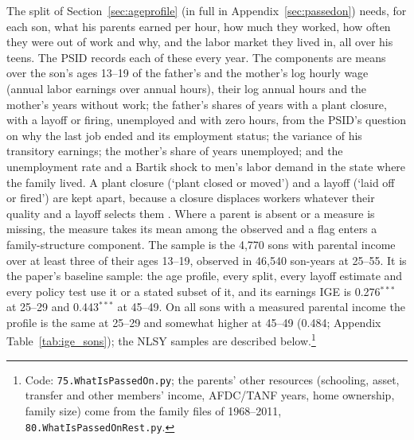 The split of Section~\ref{sec:ageprofile} (in full in Appendix~\ref{sec:passedon}) needs, for each son, what his parents earned per hour, how much they worked,
how often they were out of work and why, and the labor market they lived in, all over his teens. The PSID records each
of these every year. The components are means over the son's ages 13--19 of the father's and the mother's log hourly
wage (annual labor earnings over annual hours), their log annual hours and the mother's years without work; the
father's shares of years with a plant closure, with a layoff or firing, unemployed and with zero hours, from the
PSID's question on why the last job ended and its employment status; the variance of his transitory earnings; the
mother's share of years unemployed; and the unemployment rate and a Bartik shock to men's labor demand in the state
where the family lived. A plant closure (`plant closed or moved') and a layoff (`laid off or fired') are kept apart,
because a closure displaces workers whatever their quality and a layoff selects them \citep{gibbons1991layoffs}. Where
a parent is absent or a measure is missing, the measure takes its mean among the observed and a flag enters a
family-structure component. The sample is the 4,770 sons with parental income over at least three of their ages 13--19,
observed in 46,540 son-years at 25--55. It is the paper's baseline sample: the age profile, every split, every layoff
estimate and every policy test use it or a stated subset of it, and its earnings IGE is 0.276$^{***}$ at 25--29 and
0.443$^{***}$ at 45--49. On all sons with a measured parental income the profile is the same at 25--29 and somewhat
higher at 45--49 (0.484; Appendix Table~\ref{tab:ige_sons}); the NLSY samples are described below.\footnote{Code: \texttt{75.WhatIsPassedOn.py}; the parents' other resources
(schooling, asset, transfer and other members' income, AFDC/TANF years, home ownership, family size) come from the
family files of 1968--2011, \texttt{80.WhatIsPassedOnRest.py}.}

